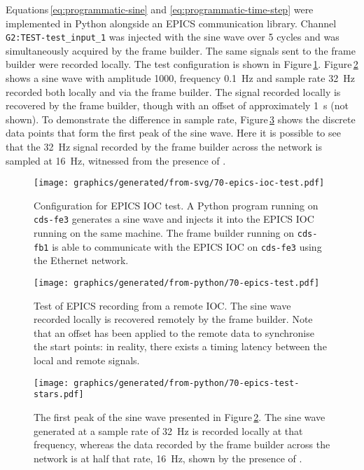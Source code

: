 Equations\,\ref{eq:programmatic-sine} and \ref{eq:programmatic-time-step} were implemented in Python alongside an \gls{EPICS} communication library. Channel \lstinline!G2:TEST-test_input_1! was injected with the sine wave over \num{5} cycles and was simultaneously acquired by the frame builder. The same signals sent to the frame builder were recorded locally. The test configuration is shown in Figure\,\ref{fig:epics-ioc-test}. Figure\,\ref{fig:epics-test} shows a sine wave with amplitude \num{1000}, frequency \SI{0.1}{\hertz} and sample rate \SI{32}{\hertz} recorded both locally and via the frame builder. The signal recorded locally is recovered by the frame builder, though with an offset of approximately \SI{1}{\second} (not shown). To demonstrate the difference in sample rate, Figure\,\ref{fig:epics-test-stars} shows the discrete data points that form the first peak of the sine wave. Here it is possible to see that the \SI{32}{\hertz} signal recorded by the frame builder across the network is sampled at \SI{16}{\hertz}, witnessed from the presence of .

\begin{figure}
  \centering
  \texttt{[image: graphics/generated/from-svg/70-epics-ioc-test.pdf]}
  \caption{\label{fig:epics-ioc-test}Configuration for EPICS IOC test. A Python program running on \lstinline!cds-fe3! generates a sine wave and injects it into the EPICS IOC running on the same machine. The frame builder running on \lstinline!cds-fb1! is able to communicate with the EPICS IOC on \lstinline!cds-fe3! using the Ethernet network.}
\end{figure}

\begin{figure}
  \centering
  \texttt{[image: graphics/generated/from-python/70-epics-test.pdf]}
  \caption{\label{fig:epics-test}Test of EPICS recording from a remote IOC. The sine wave recorded locally is recovered remotely by the frame builder. Note that an offset has been applied to the remote data to synchronise the start points: in reality, there exists a timing latency between the local and remote signals.}
\end{figure}

\begin{figure}
  \centering
  \texttt{[image: graphics/generated/from-python/70-epics-test-stars.pdf]}
  \caption{\label{fig:epics-test-stars}The first peak of the sine wave presented in Figure\,\ref{fig:epics-test}. The sine wave generated at a sample rate of \SI{32}{\hertz} is recorded locally at that frequency, whereas the data recorded by the frame builder across the network is at half that rate, \SI{16}{\hertz}, shown by the presence of .}
\end{figure}

